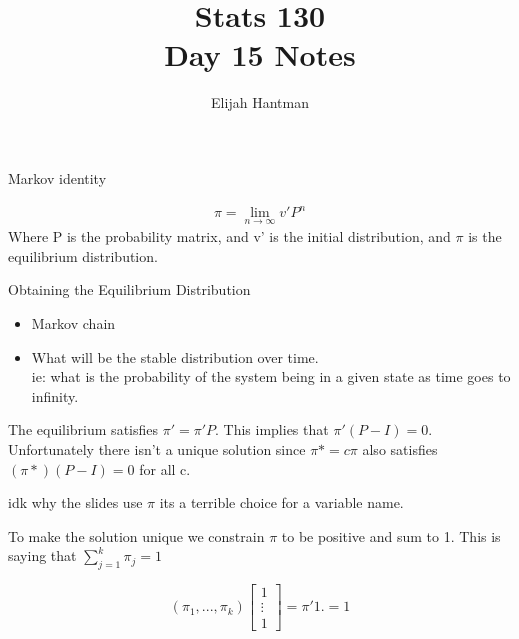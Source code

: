 \documentclass{report}
\title{\Huge{Stats 130}\\Day 15 Notes}
\author{\huge{Elijah Hantman}}
\date{}
\begin{document}
\maketitle
\newpage

\begin{description}
    \item {\large Markov identity}
        \begin{mdframed}
            \begin{gather}
                \pi = \lim_{n \to \infty} v' P^n 
            \end{gather}
            Where P is the probability matrix,
            and v' is the initial distribution, and
            $\pi$ is the equilibrium distribution.
        \end{mdframed}
    \item {\large Obtaining the Equilibrium Distribution} 
        \begin{itemize}
            \item Markov chain
            \item What will be the stable distribution
                over time.\\
                ie: what is the probability of the
                system being in a given state as time
                goes to infinity.
        \end{itemize}
        \begin{mdframed}
            The equilibrium satisfies $\pi' = \pi' P$.
            This implies that $\pi'(P-I) = 0$. 
            Unfortunately there isn't a unique
            solution since $\pi* = c\pi$ also satisfies
             $(\pi*)(P-I) = 0$ for all c.

             \begin{mdframed}
                 idk why the slides use $\pi$ its a terrible
                 choice for a variable name.
             \end{mdframed}

             To make the solution unique we constrain $\pi$
             to be positive and sum to 1. This is saying that
             $\sum_{j=1}^k \pi_j = 1$

             \begin{displaymath}
                (\pi_1, ... ,\pi_k)
                \begin{bmatrix}
                   1 \\ 
                   \vdots \\
                   1
                \end{bmatrix}
                = \pi'1. = 1
             \end{displaymath}


\end{mdframed}
\end{description}
\end{document}
